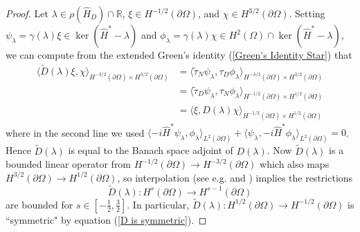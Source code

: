 \documentclass{article}
\numberwithin{equation}{section}
\begin{document}
\begin{proof}
    Let $\lambda \in \rho(\hat{H}_D)\cap \mathbb{R}$, $\xi \in H^{-1/2}(\partial \Omega)$, and $\chi \in H^{3/2}(\partial \Omega)$. Setting $\psi_\lambda=\gamma(\lambda)\xi\in \ker(\hat{H}^*-\lambda)$ and $\phi_\lambda=\gamma(\lambda)\chi\in H^2(\Omega)\cap \ker(\hat{H}^*-\lambda)$, we can compute from the extended Green's identity (\ref{Green's Identity Star}) that
    \begin{equation}\label{D is symmetric}
    \begin{split}
        \langle \tilde D (\lambda)\xi,\chi\rangle_{H^{-3/2}(\partial \Omega)\times H^{3/2}(\partial \Omega)}&=\langle \tilde \tau_N \psi_\lambda,\tau_D \phi_\lambda\rangle_{H^{-3/2}(\partial \Omega)\times H^{3/2}(\partial \Omega)}
        \\
        &=\langle \tilde \tau_D \psi_\lambda, \tau_N \phi_\lambda \rangle_{H^{-1/2}(\partial \Omega)\times H^{1/2}(\partial \Omega)}
        \\
        &=\langle \xi,D(\lambda)\chi\rangle_{H^{-1/2}(\partial \Omega)\times H^{1/2}(\partial \Omega)}
    \end{split}
    \end{equation}
    where in the second line we used $\langle -i\hat{H}^* \psi_\lambda, \phi_\lambda \rangle_{L^2(\partial \Omega)}+\langle  \psi_\lambda, -i\hat{H}^*\phi_\lambda \rangle_{L^2(\partial \Omega)}=0$. Hence $\tilde{D}(\lambda)$ is equal to the Banach space adjoint of $D(\lambda)$. Now $\tilde{D}(\lambda)$ is a bounded linear operator from $H^{-1/2}(\partial \Omega)\to H^{-3/2}(\partial \Omega)$ which also maps $H^{3/2}(\partial \Omega)\to H^{1/2}(\partial \Omega)$, so interpolation (see e.g. \cite[Theorem 1.4.3.3]{Grisvard} and \cite[Theorems 5.1 and 7.7]{LH1972}) implies the restrictions
    \begin{equation}
        \tilde{D}(\lambda):H^{s}(\partial \Omega)\to H^{s-1}(\partial \Omega)
    \end{equation}
    are bounded for $s\in [-\frac{1}{2},\frac{3}{2}]$. In particular, $\tilde{D}(\lambda):H^{1/2}(\partial \Omega)\to H^{-1/2}(\partial \Omega)$ is ``symmetric" by equation (\ref{D is symmetric}).
    \par

\end{proof}
\end{document}
